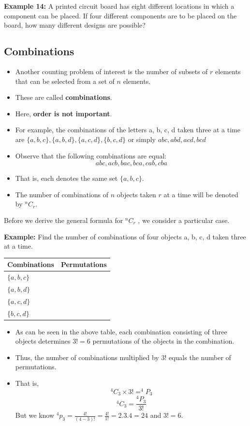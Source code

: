 \documentclass[]{book}
\providecommand{\tightlist}{%
  \setlength{\itemsep}{0pt}\setlength{\parskip}{0pt}}
\begin{document}
\textbf{Example 14:} A printed circuit board has eight different locations in which a component can be placed. If four different components are to be placed on the board, how many different designs are possible?

\hypertarget{combinations}{%
\subsection{Combinations}\label{combinations}}

\begin{itemize}
\item
  Another counting problem of interest is the number of subsets of \(r\) elements that can be selected from a set of \(n\) elements.
\item
  These are called \textbf{combinations}.
\item
  Here, \textbf{order is not important}.
\item
  For example, the combinations of the letters a, b, c, d taken three at a time are \(\{a,b,c\}, \{a,b,d\}, \{a,c,d\}, \{b,c,d\}\) or simply \(abc, abd, acd, bcd\)
\item
  Observe that the following combinations are equal:
  \[abc, acb, bac, bca, cab, cba\]
\item
  That is, each denotes the same set \(\{a, b, c\}\).
\item
  The number of combinations of \(n\) objects taken \(r\) at a time will be denoted by \(^nC_r\).
\end{itemize}

Before we derive the general formula for \(^nC_r\) , we consider a particular case.

\textbf{Example:} Find the number of combinations of four objects a, b, c, d taken three at a time.

\begin{longtable}[]{@{}ll@{}}
\toprule
Combinations & Permutations\tabularnewline
\midrule
\endhead
\(\{a,b,c\}\) &\tabularnewline
\(\{a,b,d\}\) &\tabularnewline
\(\{a,c,d\}\) &\tabularnewline
\(\{b,c,d\}\) &\tabularnewline
\bottomrule
\end{longtable}

\begin{itemize}
\tightlist
\item
  As can be seen in the above table, each combination consisting of three objects determines \(3! = 6\) permutations of the objects in the combination.
\item
  Thus, the number of combinations multiplied by \(3!\) equals the number of permutations.
\item
  That is,
  \[^4C_3\times 3! = ^4P_3\]
  \[^4C_3 = \frac{^4P_3}{3!}\]
  But we know \(^4p_3 = \frac{4!}{(4-3)!}=\frac{4!}{1!} = 2.3.4 = 24\) and \(3!=6\).
\end{itemize}
\end{document}
